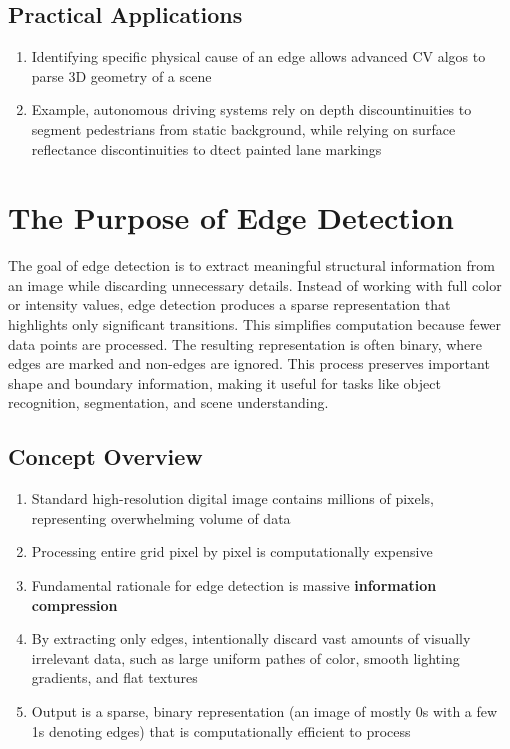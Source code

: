 \documentclass[12pt]{article}
\begin{document}
\subsection{Practical Applications}
\begin{enumerate}
    \item Identifying specific physical cause of an edge allows advanced CV algos to parse 3D geometry of a scene
    \item Example, autonomous driving systems rely on depth discountinuities to segment pedestrians from static background, while relying on surface reflectance discontinuities to dtect painted lane markings
\end{enumerate}


\section{The Purpose of Edge Detection}
The goal of edge detection is to extract meaningful structural information from an image while discarding unnecessary details. Instead of working with full color or intensity values, edge detection produces a sparse representation that highlights only significant transitions. This simplifies computation because fewer data points are processed. The resulting representation is often binary, where edges are marked and non-edges are ignored. This process preserves important shape and boundary information, making it useful for tasks like object recognition, segmentation, and scene understanding.

\subsection{Concept Overview}
\begin{enumerate}
    \item Standard high-resolution digital image contains millions of pixels, representing overwhelming volume of data
    \item Processing entire grid pixel by pixel is computationally expensive
    \item Fundamental rationale for edge detection is massive \textbf{information compression}
    \item By extracting only edges, intentionally discard vast amounts of visually irrelevant data, such as large uniform pathes of color, smooth lighting gradients, and flat textures
    \item Output is a sparse, binary representation (an image of mostly 0s with a few 1s denoting edges) that is computationally efficient to process
\end{enumerate}
\end{document}
